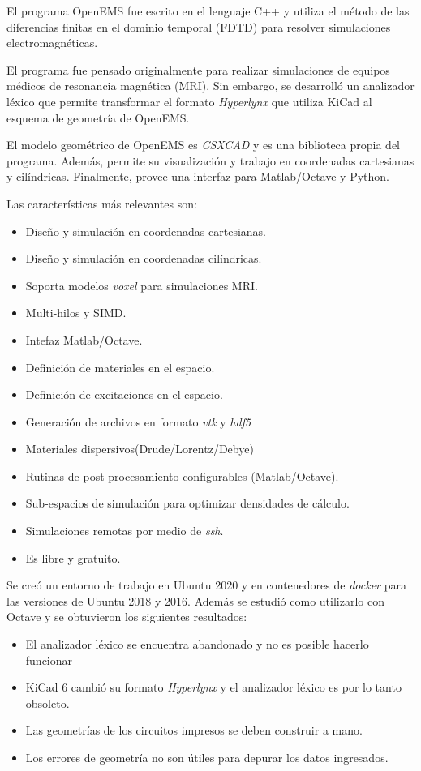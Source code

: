 \documentclass[
    11pt,
    spanish,
    a4paper
]{article}
\begin{document}
El programa OpenEMS fue escrito en el lenguaje C++ y utiliza el método de las diferencias finitas en el dominio temporal (FDTD) para resolver simulaciones electromagnéticas.

El programa fue pensado originalmente para realizar simulaciones de equipos médicos de resonancia magnética (MRI).
Sin embargo, se desarrolló un analizador léxico que permite transformar el formato \emph{Hyperlynx} que utiliza KiCad al esquema de geometría de OpenEMS.

El modelo geométrico de OpenEMS es \emph{CSXCAD} y es una biblioteca propia del programa.
Además, permite su visualización y trabajo en coordenadas cartesianas y cilíndricas.
Finalmente, provee una interfaz para Matlab/Octave y Python.

Las características más relevantes son:

\begin{itemize}
	\item Diseño y simulación en coordenadas cartesianas.
	\item Diseño y simulación en coordenadas cilíndricas.
	\item Soporta modelos \emph{voxel} para simulaciones MRI.
	\item Multi-hilos y SIMD.
	\item Intefaz Matlab/Octave.
	\item Definición de materiales en el espacio.
	\item Definición de excitaciones en el espacio.
	\item Generación de archivos en formato \emph{vtk} y \emph{hdf5}
	\item Materiales dispersivos(Drude/Lorentz/Debye)
	\item Rutinas de post-procesamiento configurables (Matlab/Octave).
	\item Sub-espacios de simulación para optimizar densidades de cálculo.
	\item Simulaciones remotas por medio de \emph{ssh}.
	\item Es libre y gratuito.
\end{itemize}

Se creó un entorno de trabajo en Ubuntu 2020 y en contenedores de \emph{docker} para las versiones de Ubuntu 2018 y 2016.
Además se estudió como utilizarlo con Octave y se obtuvieron los siguientes resultados:

\begin{itemize}
	\item El analizador léxico se encuentra abandonado y no es posible hacerlo funcionar
	\item KiCad 6 cambió su formato \emph{Hyperlynx} y el analizador léxico es por lo tanto obsoleto.
	\item Las geometrías de los circuitos impresos se deben construir a mano.
	\item Los errores de geometría no son útiles para depurar los datos ingresados.
\end{itemize}
\end{document}

